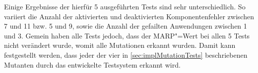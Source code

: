 Einige Ergebnisse der hierfür 5 ausgeführten Tests sind sehr unterschiedlich.
So variiert die Anzahl der aktivierten und deaktivierten Komponentenfehler zwischen 7 und 11 bzw. 5 und 9, sowie die Anzahl der gefailten Anwendungen zwischen 1 und 3.
Gemein haben alle Tests jedoch, dass der \ac{MARP}"=Wert bei allen 5 Tests nicht verändert wurde, womit alle Mutationen erkannt wurden.
Damit kann festgestellt werden, dass jeder der vier in \autoref{sec:implMutationTests} beschriebenen Mutanten durch das entwickelte Testsystem erkannt wird.
